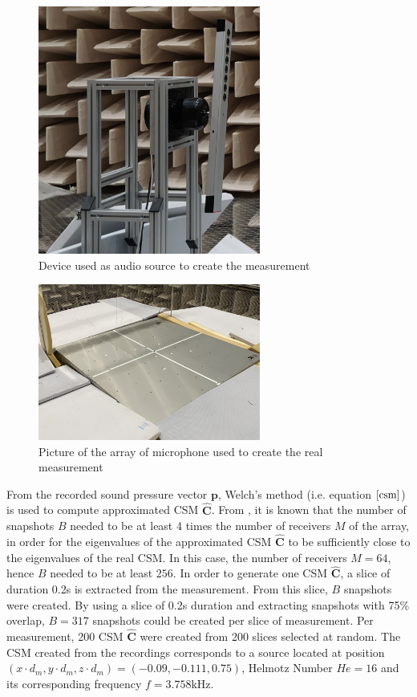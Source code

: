 \documentclass[11pt,a4paper,twoside]{report}
\begin{document}
\begin{figure}
    \centering
    \includegraphics[width=0.65\textwidth]{figs/source.png}
    \caption{Device used as audio source to create the measurement}
    \label{fig:source}
\end{figure}

\begin{figure}
    \centering
    \includegraphics[width=0.65\textwidth]{figs/microphone_array_cropped.jpg}
    \caption{Picture of the array of microphone used to create the real measurement}
    \label{fig:microphone_array}
\end{figure}


From the recorded sound pressure vector $\mathbf{p}$, Welch's method (i.e. equation $\ref{csm}$) is used to compute approximated CSM $\hat{\mathbf{C}}$. From \cite{gerstoft2012eigenvalues}, it is known that the number of snapshots $B$ needed to be at least 4 times the number of receivers $M$ of the array, in order for the eigenvalues of the approximated CSM $\hat{\mathbf{C}}$ to be sufficiently close to the eigenvalues of the real CSM. In this case, the number of receivers $M = 64$, hence $B$ needed to be at least $256$. In order to generate one CSM $\hat{\mathbf{C}}$, a slice of duration 0.2s is extracted from the measurement. From this slice, $B$ snapshots were created. By using a slice of 0.2s duration and extracting snapshots with 75\% overlap, $B = 317$ snapshots could be created per slice of measurement. Per measurement, 200 CSM $\hat{\mathbf{C}}$ were created from 200 slices selected at random. The CSM created from the recordings corresponds to a source located at position $(x \cdot d_m,y \cdot d_m, z \cdot d_m) = (-0.09,-0.111, 0.75)$, Helmotz Number $He = 16$ and its corresponding frequency $f = 3.758$kHz.
\end{document}
